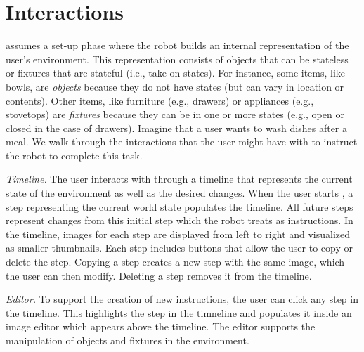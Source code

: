 \section{\projname Interactions}
\projname assumes a set-up phase where the robot builds an internal representation of the user's environment. This representation consists of objects that can be stateless or fixtures that are stateful (i.e., take on states). For instance, some items, like bowls, are \textit{objects} because they do not have states (but can vary in location or contents). Other items, like furniture (e.g., drawers) or appliances (e.g., stovetops) are \textit{fixtures} because they can be in one or more states (e.g., open or closed in the case of drawers). Imagine that a user wants to wash dishes after a meal. We walk through the interactions that the user might have with \projname to instruct the robot to complete this task.



\noindent \emph{Timeline.} The user interacts with \projname through a timeline that represents the current state of the environment as well as the desired changes. When the user starts \projname, a step representing the current world state populates the timeline. All future steps represent changes from this initial step which the robot treats as instructions. In the timeline, images for each step are displayed from left to right and visualized as smaller thumbnails. Each step includes buttons that allow the user to copy or delete the step. Copying a step creates a new step with the same image, which the user can then modify. Deleting a step removes it from the timeline.

\noindent \emph{Editor.} To support the creation of new instructions, the user can click any step in the timeline. This highlights the step in the timneline and populates it inside an image editor which appears above the timeline. The editor supports the manipulation of objects and fixtures in the environment.

